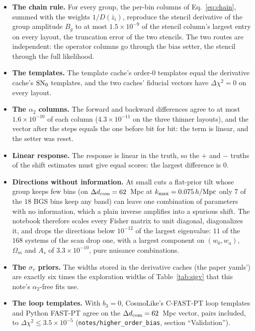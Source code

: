 \documentclass[11pt]{article}
\newcommand{\kmax}{k_{\rm max}}
\newcommand{\hMpc}{\,h/{\rm Mpc}}
\newcommand{\SNz}{{\rm SN}_0}
\begin{document}
\begin{itemize}
  \item \textbf{The chain rule.}  For every group, the per-bin columns
    of Eq.~\eqref{eq:chain}, summed with the weights $1/D(\bar{z}_i)$,
    reproduce the stencil derivative of the group amplitude $B_g$ to
    at most $1.5\times10^{-9}$ of the stencil column's largest entry
    on every layout, the truncation error of the two stencils.  The
    two routes are independent: the operator columns go through the
    bias setter, the stencil through the full likelihood.
  \item \textbf{The templates.}  The template cache's order-$0$
    templates equal the derivative cache's $\SNz$ templates, and the
    two caches' fiducial vectors have $\Delta\chi^2 = 0$ on every
    layout.
  \item \textbf{The $\alpha_2$ columns.}  The forward and backward
    differences agree to at most $1.6\times10^{-10}$ of each column
    ($4.3\times10^{-11}$ on the three thinner layouts), and the vector
    after the steps equals the one before bit for bit: the term is
    linear, and the setter was reset.
  \item \textbf{Linear response.}  The response is linear in the
    truth, so the $+$ and $-$ truths of the shift estimates must give equal
    scores: the largest difference is $0$.
  \item \textbf{Directions without information.}  At small cuts a
    flat-prior tilt whose group keeps few bins (on
    $\Delta d_{\rm com} = 62$~Mpc at $\kmax = 0.075\hMpc$ only $7$ of
    the $18$ BGS bins keep any band) can leave one combination of
    parameters with no information, which a plain inverse amplifies
    into a spurious shift.  The notebook therefore scales every Fisher
    matrix to unit diagonal, diagonalizes it, and drops the directions
    below $10^{-12}$ of the largest eigenvalue: $11$ of the $168$
    systems of the scan drop one, with a largest component on
    $(w_0, w_a)$, $\Omega_m$ and $A_s$ of $3.3\times10^{-10}$, pure
    nuisance combinations.
  \item \textbf{The $\sigma_v$ priors.}  The widths stored in the
    derivative caches (the paper yamls') are exactly six times the
    exploration widths of Table~\ref{tab:sigv} that this note's
    $\alpha_2$-free fits use.
  \item \textbf{The loop templates.}  With $b_3 = 0$, CosmoLike's
    C-FAST-PT loop templates and Python FAST-PT agree on the
    $\Delta d_{\rm com} = 62$~Mpc vector, pairs included, to
    $\Delta\chi^2 \le 3.5\times10^{-5}$
    (\texttt{notes/higher\_order\_bias}, section ``Validation'').
\end{itemize}
\end{document}
